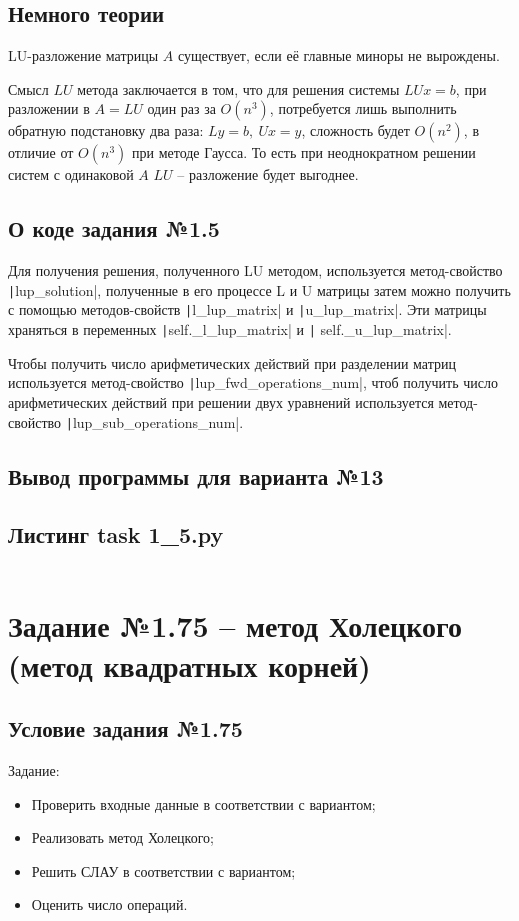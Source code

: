 \subsection{Немного теории}
LU-разложение матрицы $A$ существует, если её главные миноры не вырождены.

Смысл $LU$ метода заключается в том, что для решения системы $LUx=b$, при разложении в $A=LU$ один раз за $O(n^3)$, потребуется лишь выполнить обратную подстановку два раза: $Ly=b,\ Ux=y$, сложность будет $O(n^2)$, в отличие от $O(n^3)$ при методе Гаусса. То есть при неоднократном решении систем с одинаковой $A$ $LU$ -- разложение будет выгоднее.

\subsection{О коде задания №1.5}
Для получения решения, полученного LU методом, используется метод-свойство \texttt|lup_solution|, полученные в его процессе L и U матрицы затем можно получить с помощью методов-свойств \texttt|l_lup_matrix| и \texttt|u_lup_matrix|. Эти матрицы храняться в переменных \texttt|self._l_lup_matrix| и \texttt|
self._u_lup_matrix|.

Чтобы получить число арифметических действий при разделении матриц используется метод-свойство \texttt|lup_fwd_operations_num|, чтоб получить число арифметических действий при решении двух уравнений используется метод-свойство \texttt|lup_sub_operations_num|.
\subsection{Вывод программы для варианта №13}

\subsection{Листинг task 1\_5.py}
\inputminted{python}{code/task1_5.py}

\section{Задание №1.75 -- метод Холецкого (метод квадратных корней)}
\subsection{Условие задания №1.75}
Задание:
\begin{itemize}
    \item Проверить входные данные в соответствии с вариантом;
    \item Реализовать метод Холецкого;
    \item Решить СЛАУ в соответствии с вариантом;
    \item Оценить число операций.
\end{itemize}
